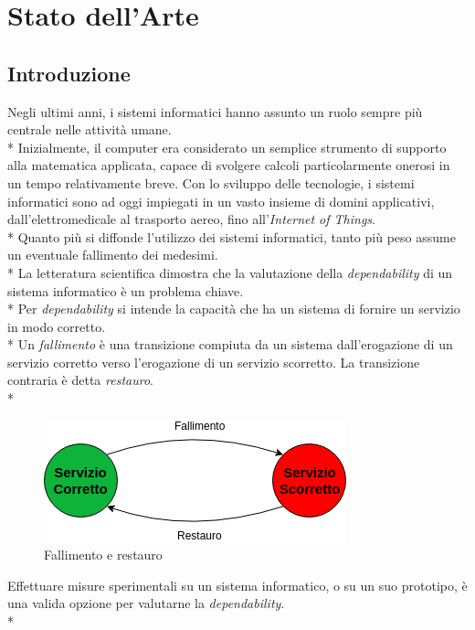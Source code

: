 \chapter{Stato dell'Arte}
\section{Introduzione}
Negli ultimi anni, i sistemi informatici hanno assunto un ruolo sempre pi\`u centrale nelle attivit\`a umane.\\*
Inizialmente, il computer era considerato un semplice strumento di supporto alla matematica applicata, capace di svolgere calcoli particolarmente onerosi in un tempo relativamente breve. Con lo sviluppo delle tecnologie, i sistemi informatici sono ad oggi impiegati in un vasto insieme di domini applicativi, dall'elettromedicale al trasporto aereo, fino all'\emph{Internet of Things}.\\*
Quanto pi\`u si diffonde l'utilizzo dei sistemi informatici, tanto pi\`u peso assume un eventuale fallimento dei medesimi.\\*
La letteratura scientifica dimostra che la valutazione della \emph{dependability} di un sistema informatico \`e un problema chiave.\\*
Per \emph{dependability} si intende la capacit\`a che ha un sistema di fornire un servizio in modo corretto. \cite{depdef}\\*
Un \emph{fallimento} \`e una transizione compiuta da un sistema dall'erogazione di un servizio corretto verso l'erogazione di un servizio scorretto. La transizione contraria \`e detta \emph{restauro}.\\*
\begin{figure}[h]
	\centering
	\includegraphics[width=0.7\linewidth]{img/FallimentoRestauro}
	\caption{Fallimento e restauro}
	\label{fig:fallimentorestauro}
\end{figure}\newpage
Effettuare misure sperimentali su un sistema informatico, o su un suo prototipo, \`e una valida opzione per valutarne la \emph{dependability}.\\*
